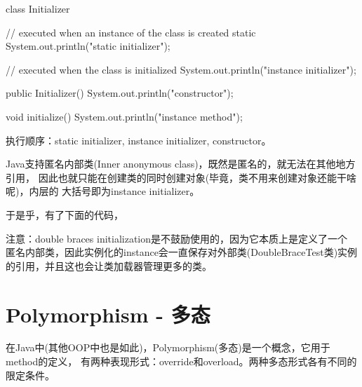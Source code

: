 \documentclass[a4paper,11pt]{article}
\begin{document}
\begin{javacode}
class Initializer {

  // executed when an instance of the class is created
  static {
    System.out.println("static initializer");
  }

  // executed when the class is initialized
  {
    System.out.println("instance initializer");
  }

  public Initializer() {
    System.out.println("constructor");
  }

  void initialize() {
    System.out.println("instance method");
  }
}
\end{javacode}

执行顺序：static initializer, instance initializer, constructor。

Java支持匿名内部类(Inner anonymous class)，既然是匿名的，就无法在其他地方引用，
因此也就只能在创建类的同时创建对象(毕竟，类不用来创建对象还能干啥呢)，内层的
大括号即为instance initializer。

于是乎，有了下面的代码，


注意：double braces initialization是不鼓励使用的，因为它本质上是定义了一个
匿名内部类，因此实例化的instance会一直保存对外部类(DoubleBraceTest类)实例
的引用，并且这也会让类加载器管理更多的类。

\section[Polymorphism - 多态]{Polymorphism - 多态}
在Java中(其他OOP中也是如此)，Polymorphism(多态)是一个概念，它用于method的定义，
有两种表现形式：override和overload。两种多态形式各有不同的限定条件。
\end{document}
